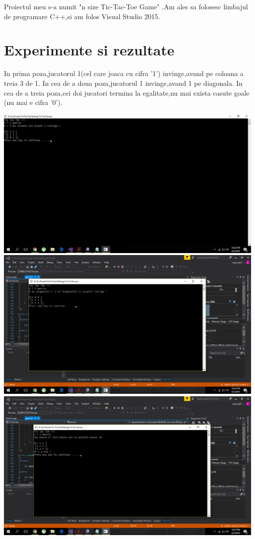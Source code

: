 \documentclass[12]{article}
\begin{document}
\textcolor{white}{}

Proiectul meu s-a numit "n size Tic-Tac-Toe Game" .Am ales sa folosesc limbajul de programare C++,si am folos Visual Studio 2015.

\section{Experimente si rezultate}
\textcolor{white}{}

In prima poza,jucatorul 1(cel care joaca cu cifra '1') invinge,avand pe coloana a treia 3 de 1.
In cea de a doua poza,jucatorul 1 invinge,avand 1 pe diagonala.
In cea de a treia poza,cei doi jucatori termina la egalitate,nu mai exista casute goale (nu mai e cifra '0').


\includegraphics[scale=0.2]{prima.png}
\includegraphics[scale=0.2]{adoua.png}
\includegraphics[scale=0.2]{atreia.png}
\end{document}
